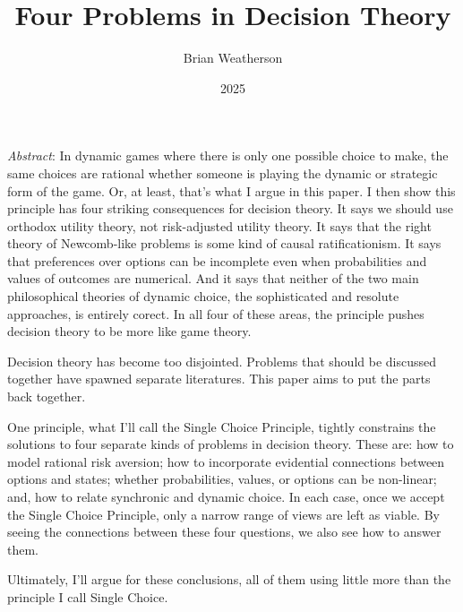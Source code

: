 \documentclass[
  11pt,
  letterpaper,
  DIV=11,
  numbers=noendperiod,
  twoside]{scrartcl}
\title{Four Problems in Decision Theory}
\author{Brian Weatherson}
\date{2025}
\renewenvironment{abstract}
 {\vspace{-1.25cm}
 \quotation\small\noindent\emph{Abstract}:}
 {\endquotation}
\renewenvironment{abstract}
 {\quotation\small\noindent\emph{Abstract}:}
 {\endquotation\vspace{-0.02cm}}
\begin{document}
\maketitle
\begin{abstract}
In dynamic games where there is only one possible choice to make, the
same choices are rational whether someone is playing the dynamic or
strategic form of the game. Or, at least, that's what I argue in this
paper. I then show this principle has four striking consequences for
decision theory. It says we should use orthodox utility theory, not
risk-adjusted utility theory. It says that the right theory of
Newcomb-like problems is some kind of causal ratificationism. It says
that preferences over options can be incomplete even when probabilities
and values of outcomes are numerical. And it says that neither of the
two main philosophical theories of dynamic choice, the sophisticated and
resolute approaches, is entirely corect. In all four of these areas, the
principle pushes decision theory to be more like game theory.
\end{abstract}


Decision theory has become too disjointed. Problems that should be
discussed together have spawned separate literatures. This paper aims to
put the parts back together.

One principle, what I'll call the Single Choice Principle, tightly
constrains the solutions to four separate kinds of problems in decision
theory. These are: how to model rational risk aversion; how to
incorporate evidential connections between options and states; whether
probabilities, values, or options can be non-linear; and, how to relate
synchronic and dynamic choice. In each case, once we accept the Single
Choice Principle, only a narrow range of views are left as viable. By
seeing the connections between these four questions, we also see how to
answer them.

Ultimately, I'll argue for these conclusions, all of them using little
more than the principle I call Single Choice.
\end{document}
